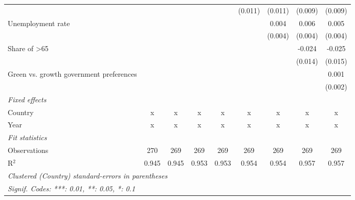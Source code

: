 \begin{table}[htbp]
\begin{tabular}{lcccccccc}
                                                      &         &         &                &                & (0.011)        & (0.011)        & (0.009)        & (0.009)\\   
      Unemployment rate                               &         &         &                &                &                & 0.004          & 0.006          & 0.005\\   
                                                      &         &         &                &                &                & (0.004)        & (0.004)        & (0.004)\\   
      Share of >65                                    &         &         &                &                &                &                & -0.024         & -0.025\\   
                                                      &         &         &                &                &                &                & (0.014)        & (0.015)\\   
      Green vs. growth government preferences         &         &         &                &                &                &                &                & 0.001\\   
                                                      &         &         &                &                &                &                &                & (0.002)\\   
      \emph{Fixed effects}\\
      Country                                         & x       & x       & x              & x              & x              & x              & x              & x\\  
      Year                                            & x       & x       & x              & x              & x              & x              & x              & x\\  
      \midrule \emph{Fit statistics}\\
      Observations                                    & 270     & 269     & 269            & 269            & 269            & 269            & 269            & 269\\  
      R$^2$                                           & 0.945   & 0.945   & 0.953          & 0.953          & 0.954          & 0.954          & 0.957          & 0.957\\  
      \midrule
      \multicolumn{9}{l}{\emph{Clustered (Country) standard-errors in parentheses}}\\
      \multicolumn{9}{l}{\emph{Signif. Codes: ***: 0.01, **: 0.05, *: 0.1}}\\
   \end{tabular}
\end{table}


